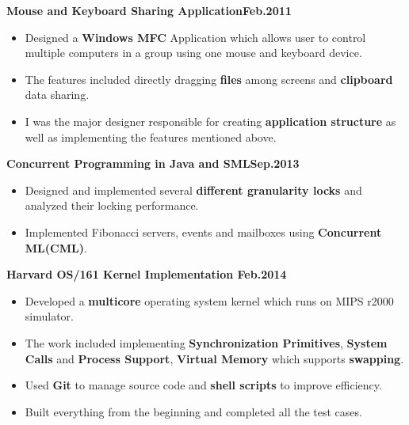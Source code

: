 \documentclass{myres}
\begin{document}
{
	\par
	\textbf{Mouse and Keyboard Sharing Application\hfill Feb.2011}
	\begin{itemize}[topsep=0pt, leftmargin=0.2in] \itemsep -5pt
			\item Designed a \textbf{Windows MFC} Application which allows user to control multiple computers in a group using one mouse and keyboard device. 
			\item The features included directly dragging \textbf{files} among screens and \textbf{clipboard} data sharing. 
		\item I was the major designer responsible for creating \textbf{application structure} as well as implementing the
					features mentioned above.
	\end{itemize}

	\par
	\smallskip

	\textbf{Concurrent Programming in Java and SML\hfill Sep.2013}
	\begin{itemize}[topsep=0pt, leftmargin=0.2in] \itemsep -5pt
			\item Designed and implemented several \textbf{different granularity locks} and analyzed their locking performance.
		\item Implemented Fibonacci servers, events and mailboxes using \textbf{Concurrent ML(CML)}.
	\end{itemize}

	\par
	\smallskip

	\textbf{Harvard OS/161 Kernel Implementation \hfill Feb.2014}
	\begin{itemize}[topsep=0pt, leftmargin=0.2in] \itemsep -5pt
			\item Developed a \textbf{multicore} operating system kernel which runs on MIPS r2000 simulator.
		\item The work included implementing \textbf{Synchronization Primitives}, \textbf{System Calls} and \textbf{Process Support},
			\textbf{Virtual Memory} which supports \textbf{swapping}.
		\item Used \textbf{Git} to manage source code and \textbf{shell scripts} to improve efficiency.
		\item Built everything from the beginning and completed all the test cases. 
	\end{itemize}

	\par
	\smallskip

}
\end{document}
